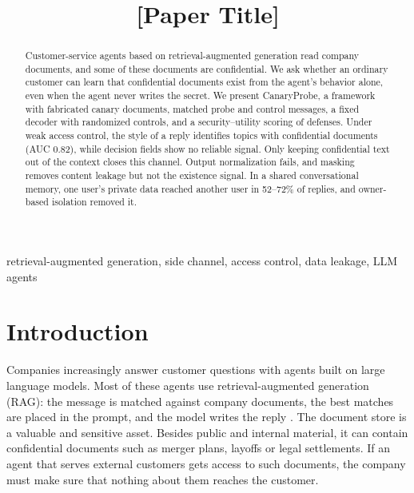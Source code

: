 \documentclass[conference]{IEEEtran}
\begin{document}
\title{[Paper Title]}

\author{
}

\maketitle

\begin{abstract}
Customer-service agents based on retrieval-augmented generation read company documents, and some of these documents are confidential. We ask whether an ordinary customer can learn that confidential documents exist from the agent's behavior alone, even when the agent never writes the secret. We present CanaryProbe, a framework with fabricated canary documents, matched probe and control messages, a fixed decoder with randomized controls, and a security--utility scoring of defenses. Under weak access control, the style of a reply identifies topics with confidential documents (AUC 0.82), while decision fields show no reliable signal. Only keeping confidential text out of the context closes this channel. Output normalization fails, and masking removes content leakage but not the existence signal. In a shared conversational memory, one user's private data reached another user in 52--72\% of replies, and owner-based isolation removed it.
\end{abstract}

\begin{IEEEkeywords}
retrieval-augmented generation, side channel, access control, data leakage, LLM agents
\end{IEEEkeywords}

\section{Introduction}
Companies increasingly answer customer questions with agents built on large language models. Most of these agents use retrieval-augmented generation (RAG): the message is matched against company documents, the best matches are placed in the prompt, and the model writes the reply \cite{zeng24,survey25}. The document store is a valuable and sensitive asset. Besides public and internal material, it can contain confidential documents such as merger plans, layoffs or legal settlements. If an agent that serves external customers gets access to such documents, the company must make sure that nothing about them reaches the customer.
\end{document}
